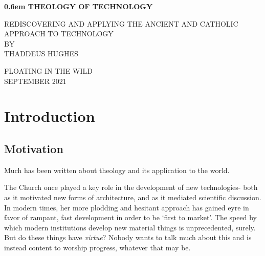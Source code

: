 \documentclass[letterpaper]{article}
\begin{document}
\clearpage
\newcommand\nbvspace[1][3]{\vspace*{\stretch{#1}}}
\newcommand\nbstretchyspace{\spaceskip0.5em plus 0.25em minus 0.25em}
\newcommand{\nbtitlestretch}{\spaceskip0.6em}
\pagestyle{plain}
\begin{center}
  \bfseries
  \nbvspace[1]
  \Huge
  {\nbtitlestretch\huge
    THEOLOGY OF TECHNOLOGY}

  \nbvspace[1]
  \normalsize
  REDISCOVERING AND APPLYING THE ANCIENT AND CATHOLIC APPROACH TO TECHNOLOGY\\

  \nbvspace[1]
  \small BY\\
  \Large THADDEUS HUGHES\\

  \nbvspace[2]

  \nbvspace[3]
  \normalsize

  \large
  FLOATING IN THE WILD \\
  \small SEPTEMBER 2021 \\
\end{center}

\raggedbottom
\tableofcontents

\newpage

\section{Introduction}

\subsection{Motivation}


Much has been written about theology and its application to the world. 

The Church once played a key role in the development of new technologies- both as it motivated new forms of architecture, and as it mediated scientific discussion. In modern times, her more plodding and hesitant approach has gained eyre in favor of rampant, fast development in order to be `first to market'. The speed by which modern institutions develop new material things is unprecedented, surely. But do these things have \textit{virtue}? Nobody wants to talk much about this and is instead content to worship progress, whatever that may be.
\end{document}
